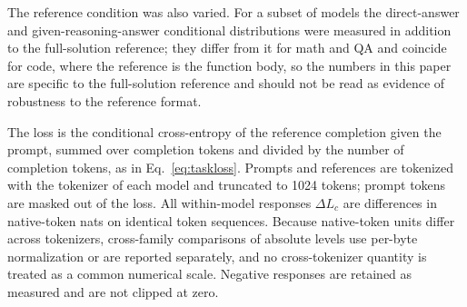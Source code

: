 The reference condition was also varied. For a subset of models the
direct-answer and given-reasoning-answer conditional distributions were
measured in addition to the full-solution reference; they differ from
it for math and QA and coincide for code, where the reference is the
function body, so the numbers in this paper are specific to the
full-solution reference and should not be read as evidence of robustness to the reference format.

The loss is the conditional cross-entropy of the reference completion
given the prompt, summed over completion tokens and divided by the
number of completion tokens, as in Eq.~\ref{eq:taskloss}. Prompts and
references are tokenized with the tokenizer of each model and truncated to
1024 tokens; prompt tokens are masked out of the loss. All within-model
responses $\Delta L_c$ are differences in native-token nats
on identical token sequences. Because native-token units differ across
tokenizers, cross-family comparisons of absolute levels use per-byte
normalization or are reported separately, and no cross-tokenizer
quantity is treated as a common numerical scale. Negative responses are
retained as measured and are not clipped at zero.

